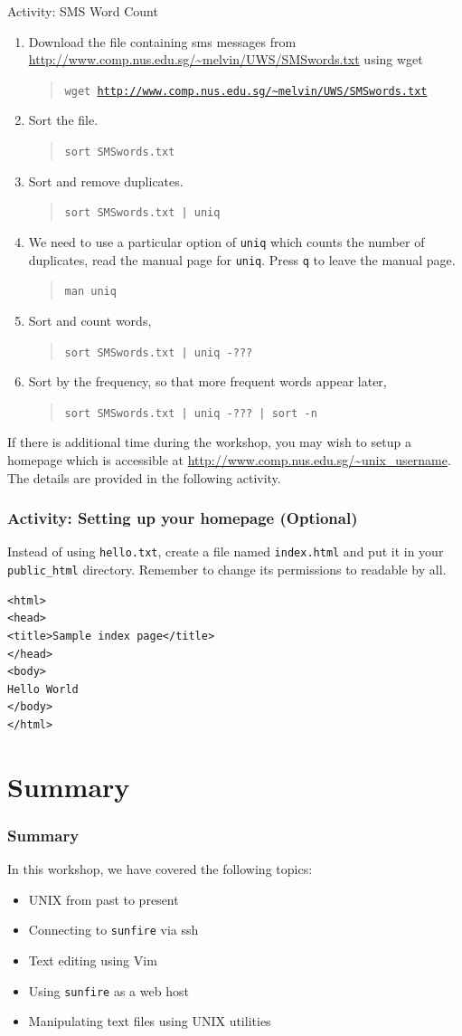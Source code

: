 \documentclass[a4paper]{beamer}
\newcommand{\ftitle}[1]{\frametitle<presentation>{#1}}
\newcommand{\cmd}[1]{\begin{quote}{\tt #1}\end{quote}}
\begin{document}
\begin{frame}[allowframebreaks=0.6]{Activity: SMS Word Count}

\begin{enumerate}
\item Download the file containing sms messages from \url{http://www.comp.nus.edu.sg/~melvin/UWS/SMSwords.txt} using wget 
\cmd{wget \url{http://www.comp.nus.edu.sg/~melvin/UWS/SMSwords.txt}}  
\item Sort the file.  \cmd{sort SMSwords.txt} 
\item Sort and remove duplicates.   \cmd{sort SMSwords.txt | uniq} 
\item We need to use a particular option of \texttt{uniq} which counts the
number of duplicates, read the manual page for \texttt{uniq}. Press \texttt{q}
to leave the manual page.   \cmd{man uniq} 
\item Sort and count words, \cmd{sort SMSwords.txt | uniq -???} 
\item Sort by the frequency, so that more frequent words appear later, 
\cmd{sort SMSwords.txt | uniq -??? | sort -n}
\end{enumerate}
\end{frame}

If there is additional time during the workshop, you may wish to setup a
homepage which is accessible at \url{http://www.comp.nus.edu.sg/~unix_username}.
The details are provided in the following activity.  

\begin{frame}[fragile]
\frametitle{Activity: Setting up your homepage (Optional)}
Instead of using \texttt{hello.txt}, create a file named \texttt{index.html} and
put it in your \texttt{public\_html} directory. Remember to change its
permissions to readable by all.  

\begin{verbatim}
<html>
<head>
<title>Sample index page</title>
</head>
<body>
Hello World
</body>
</html>
\end{verbatim}
\end{frame}

\section{Summary}

\begin{frame}
\ftitle{Summary}
In this workshop, we have covered the following topics:
\begin{itemize}
\item UNIX from past to present
\item Connecting to \texttt{sunfire} via ssh
\item Text editing using Vim
\item Using \texttt{sunfire} as a web host
\item Manipulating text files using UNIX utilities
\end{itemize}
\end{frame}
\end{document}
